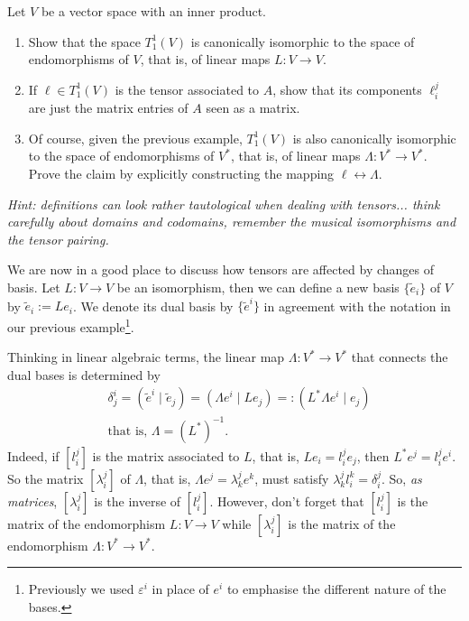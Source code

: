 \begin{exercise}
  Let $V$ be a vector space with an inner product.
  \begin{enumerate}
    \item Show that the space $T^1_1(V)$ is canonically isomorphic to the space of endomorphisms of $V$, that is, of linear maps $L:V\to V$.

    \item If $\ell\in T^1_1(V)$ is the tensor associated to $A$, show that its components $\ell_i^j$ are just the matrix entries of $A$ seen as a matrix.
  
    \item Of course, given the previous example, $T^1_1(V)$ is also canonically isomorphic to the space of endomorphisms of $V^*$, that is, of linear maps $\Lambda:V^*\to V^*$.
    Prove the claim by explicitly constructing the mapping $\ell \leftrightarrow \Lambda$.
  \end{enumerate}
  \textit{\small Hint: definitions can look rather tautological when dealing with tensors... think carefully about domains and codomains, remember the musical isomorphisms and the tensor pairing.}
\end{exercise}

We are now in a good place to discuss how tensors are affected by changes of basis.
Let $L: V\to V$ be an isomorphism, then we can define a new basis $\{\widetilde e_i\}$ of $V$ by $\widetilde e_i := L e_i$. We denote its dual basis by $\{\widetilde e^i\}$ in agreement with the notation in our previous example\footnote{Previously we used $\varepsilon^i$ in place of $e^i$ to emphasise the different nature of the bases.}.

Thinking in linear algebraic terms, the linear map $\Lambda:V^*\to V^*$ that connects the dual bases is determined by
\begin{align}
  &\delta^i_j = (\widetilde e^i \mid \widetilde e_j) = (\Lambda e^i \mid L e_j ) =: (L^* \Lambda e^i \mid e_j)\\
  &\mbox{that is, } \Lambda = (L^*)^{-1}.
\end{align}
Indeed, if $[l_i^j]$ is the matrix associated to $L$, that is, $L e_i = l_i^j e_j$, then $L^* e^j = l_i^j e^i$. So the matrix $[\lambda_i^j]$ of $\Lambda$, that is, $\Lambda e^j = \lambda_k^j e^k$, must satisfy $\lambda_k^j l_i^k= \delta_i^j$. So, \emph{as matrices}, $[\lambda_i^j]$ is the inverse of $[l_i^j]$. However, don't forget that $[l_i^j]$ is the matrix of the endomorphism $L:V\to V$ while $[\lambda_i^j]$ is the matrix of the endomorphism $\Lambda: V^*\to V^*$.


